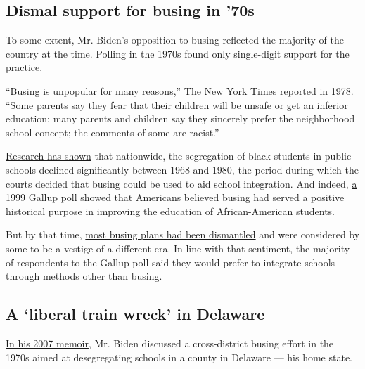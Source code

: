\hypertarget{dismal-support-for-busing-in-70s}{%
\subsection{Dismal support for busing in
'70s}\label{dismal-support-for-busing-in-70s}}

To some extent, Mr. Biden's opposition to busing reflected the majority
of the country at the time. Polling in the 1970s found only single-digit
support for the practice.

``Busing is unpopular for many reasons,''
\href{https://www.nytimes3xbfgragh.onion/1978/03/13/archives/nations-resistance-to-busing-softens-but-rate-is-slowed-nations.html}{The
New York Times reported in 1978}. ``Some parents say they fear that
their children will be unsafe or get an inferior education; many parents
and children say they sincerely prefer the neighborhood school concept;
the comments of some are racist.''

\href{https://www.civilrightsproject.ucla.edu/research/k-12-education/integration-and-diversity/public-school-desegregation-in-the-united-states-1968-1980/orfield_american-desegregation-1983.pdf}{Research
has shown} that nationwide, the segregation of black students in public
schools declined significantly between 1968 and 1980, the period during
which the courts decided that busing could be used to aid school
integration. And indeed,
\href{https://news.gallup.com/poll/3577/americans-want-integrated-schools-oppose-school-busing.aspx}{a
1999 Gallup poll} showed that Americans believed busing had served a
positive historical purpose in improving the education of
African-American students.

But by that time,
\href{https://www.nytimes3xbfgragh.onion/1999/09/11/us/by-court-order-busing-ends-where-it-began.html?mtrref=www.google.com\&gwh=8FCED2DAE1A76942112CE3A94FF569A0\&gwt=pay}{most
busing plans had been dismantled} and were considered by some to be a
vestige of a different era. In line with that sentiment, the majority of
respondents to the Gallup poll said they would prefer to integrate
schools through methods other than busing.

\hypertarget{a-liberal-train-wreck-in-delaware}{%
\subsection{A `liberal train wreck' in
Delaware}\label{a-liberal-train-wreck-in-delaware}}

\href{https://books.google.com/books?id=3SqRQnn4IykC\&q=busing\#v=snippet\&q=busing\&f=false}{In
his 2007 memoir}, Mr. Biden discussed a cross-district busing effort in
the 1970s aimed at desegregating schools in a county in Delaware --- his
home state.

